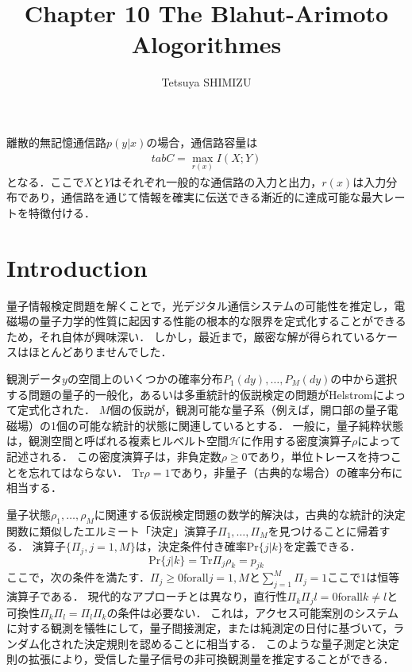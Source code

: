 \documentclass{ltjsarticle}
\begin{document}
\title{Chapter 10 The Blahut-Arimoto Alogorithmes}
\author{Tetsuya SHIMIZU}
\maketitle

離散的無記憶通信路$p(y|x)$の場合，通信路容量は
\begin{eqnarray}
  tab   
  C = \max_{r(x)} I(X;Y)
\end{eqnarray}
となる．ここで$X$と$Y$はそれぞれ一般的な通信路の入力と出力，$r(x)$は入力分布であり，通信路を通じて情報を確実に伝送できる漸近的に達成可能な最大レートを特徴付ける．



\section{Introduction}
量子情報検定問題を解くことで，光デジタル通信システムの可能性を推定し，電磁場の量子力学的性質に起因する性能の根本的な限界を定式化することができるため，それ自体が興味深い．
しかし，最近まで，厳密な解が得られているケースはほとんどありませんでした．

観測データ$y$の空間上のいくつかの確率分布$P_1(dy), \dots, P_M(dy)$の中から選択する問題の量子的一般化，あるいは多重統計的仮説検定の問題がHelstromによって定式化された．
$M$個の仮説が，観測可能な量子系（例えば，開口部の量子電磁場）の1個の可能な統計的状態に関連しているとする．
一般に，量子純粋状態は，観測空間と呼ばれる複素ヒルベルト空間$\mathscr{H}$に作用する密度演算子$\rho$によって記述される．
この密度演算子は，非負定数$\rho \geq 0$であり，単位トレースを持つことを忘れてはならない．
$\mathrm{Tr} \rho = 1$であり，非量子（古典的な場合）の確率分布に相当する．

量子状態$\rho_1, \dots, \rho_M$に関連する仮説検定問題の数学的解決は，古典的な統計的決定関数に類似したエルミート「決定」演算子$\Pi_1, \dots,\Pi_M$を見つけることに帰着する．
演算子$\{ \Pi_j, j = 1, M \}$は，決定条件付き確率$\mathrm{Pr} \{j | k \}$を定義できる．
\begin{equation}
  \mathrm{Pr} \{ j | k\} = \mathrm{Tr} \Pi_j \rho_k = p_{jk}  
\end{equation}
ここで，次の条件を満たす．$\Pi_j \geq 0 \mathrm{for all} j = 1, M$と$\sum_{j=1}^{M} \Pi_j = 1$ここで1は恒等演算子である．
現代的なアプローチとは異なり，直行性$\Pi_k \Pi_jl = 0 \mathrm{for all} k \neq l$と可換性$\Pi_k \Pi_l = \Pi_l \Pi_k$の条件は必要ない．
これは，アクセス可能案別のシステムに対する観測を犠牲にして，量子間接測定，または純測定の日付に基づいて，ランダム化された決定規則を認めることに相当する．
このような量子測定と決定則の拡張により，受信した量子信号の非可換観測量を推定することができる．
\end{document}
